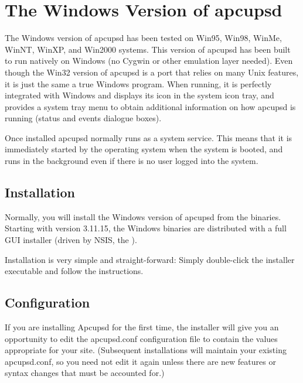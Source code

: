 {{{{{{{\section*{The Windows Version of apcupsd}
\label{The-Windows-Version-of-apcupsd}

The Windows version of apcupsd has been tested on Win95, Win98, WinMe, WinNT,
WinXP, and Win2000 systems. This version of apcupsd has been built to run
natively on Windows (no Cygwin or other emulation layer needed). Even though
the Win32 version of apcupsd is a port that relies on many Unix features, it
is just the same a true Windows program. When running, it is perfectly 
integrated with Windows and displays its icon in the system icon tray, and
provides a system tray menu to obtain additional information on how apcupsd 
is running (status and events dialogue boxes).

Once installed apcupsd normally runs as a system service.  This means that it
is immediately started by the operating system when the system is booted, and
runs in the background even if there is no user logged into the system. 

\label{Installation}
\subsection*{Installation}

Normally, you will install the Windows version of apcupsd from the binaries.
Starting with version 3.11.15, the Windows binaries are distributed with
a full GUI installer (driven by NSIS, the 
).

Installation is very simple and straight-forward: Simply double-click the
installer executable and follow the instructions.

\label{Configuration}
\subsection*{Configuration}

If you are installing Apcupsd for the first time, the installer will give
you an opportunity to edit the apcupsd.conf configuration file to contain
the values appropriate for your site. (Subsequent installations will
maintain your existing apcupsd.conf, so you need not edit it again unless
there are new features or syntax changes that must be accounted for.)

}}}}}}}
